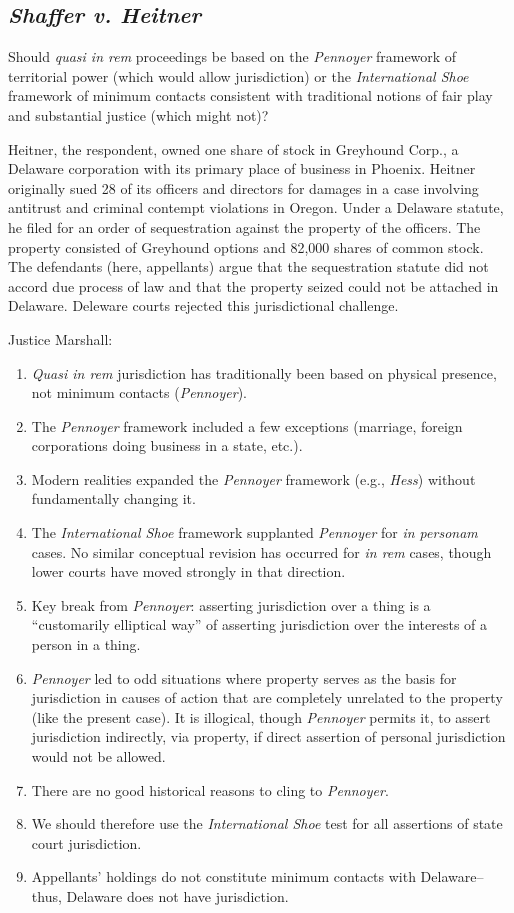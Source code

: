 \subsection{\emph{Shaffer v. Heitner}}

Should \emph{quasi in rem} proceedings be based on the \emph{Pennoyer}
framework of territorial power (which would allow jurisdiction) or the
\emph{International Shoe} framework of minimum contacts consistent with
traditional notions of fair play and substantial justice (which might
not)?

Heitner, the respondent, owned one share of stock in Greyhound Corp., a
Delaware corporation with its primary place of business in Phoenix.
Heitner originally sued 28 of its officers and directors for damages in
a case involving antitrust and criminal contempt violations in Oregon.
Under a Delaware statute, he filed for an order of sequestration against
the property of the officers. The property consisted of Greyhound
options and 82,000 shares of common stock. The defendants (here,
appellants) argue that the sequestration statute did not accord due
process of law and that the property seized could not be attached in
Delaware. Deleware courts rejected this jurisdictional challenge.

Justice Marshall:
\begin{enumerate}
\item
  \emph{Quasi in rem} jurisdiction has traditionally been based on
  physical presence, not minimum contacts (\emph{Pennoyer}).
\item
  The \emph{Pennoyer} framework included a few exceptions (marriage,
  foreign corporations doing business in a state, etc.).
\item
  Modern realities expanded the \emph{Pennoyer} framework (e.g.,
  \emph{Hess}) without fundamentally changing it.
\item
  The \emph{International Shoe} framework supplanted \emph{Pennoyer} for
  \emph{in personam} cases. No similar conceptual revision has occurred
  for \emph{in rem} cases, though lower courts have moved strongly in
  that direction.
\item
  Key break from \emph{Pennoyer}: asserting jurisdiction over a thing is
  a ``customarily elliptical way'' of asserting jurisdiction over the
  interests of a person in a thing.
\item
  \emph{Pennoyer} led to odd situations where property serves as the
  basis for jurisdiction in causes of action that are completely
  unrelated to the property (like the present case). It is illogical,
  though \emph{Pennoyer} permits it, to assert jurisdiction indirectly,
  via property, if direct assertion of personal jurisdiction would not
  be allowed.
\item
  There are no good historical reasons to cling to \emph{Pennoyer}.
\item
  We should therefore use the \emph{International Shoe} test for all
  assertions of state court jurisdiction.
\item
  Appellants' holdings do not constitute minimum contacts with
  Delaware--thus, Delaware does not have jurisdiction.
\end{enumerate}

